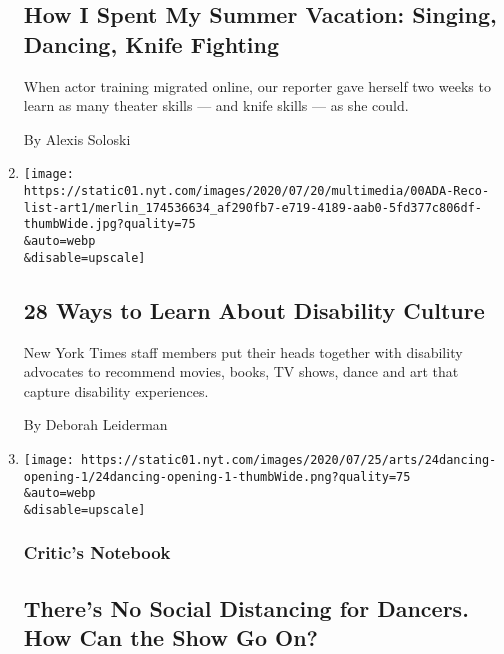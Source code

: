 \begin{enumerate}
{  \subsection{How I Spent My Summer Vacation: Singing, Dancing, Knife
  Fighting}\label{how-i-spent-my-summer-vacation-singing-dancing-knife-fighting}}

  When actor training migrated online, our reporter gave herself two
  weeks to learn as many theater skills --- and knife skills --- as she
  could.

  By Alexis Soloski
\item
  \href{/2020/07/24/arts/disability-movies-books-tv.html}{}

  \texttt{[image: https://static01.nyt.com/images/2020/07/20/multimedia/00ADA-Reco-list-art1/merlin\_174536634\_af290fb7-e719-4189-aab0-5fd377c806df-thumbWide.jpg?quality=75\\\&auto=webp\\\&disable=upscale]}

  \hypertarget{28-ways-to-learn-about-disability-culture}{%
  \subsection{28 Ways to Learn About Disability
  Culture}\label{28-ways-to-learn-about-disability-culture}}

  New York Times staff members put their heads together with disability
  advocates to recommend movies, books, TV shows, dance and art that
  capture disability experiences.

  By Deborah Leiderman
\item
  \href{/2020/07/24/arts/dance/safety-protocols-dance-coronavirus.html}{}

  \texttt{[image: https://static01.nyt.com/images/2020/07/25/arts/24dancing-opening-1/24dancing-opening-1-thumbWide.png?quality=75\\\&auto=webp\\\&disable=upscale]}

  \hypertarget{critics-notebook-1}{%
  \subsubsection{Critic's Notebook}\label{critics-notebook-1}}

  \hypertarget{theres-no-social-distancing-for-dancers-how-can-the-show-go-on}{%
  \subsection{There's No Social Distancing for Dancers. How Can the Show
  Go
  On?}\label{theres-no-social-distancing-for-dancers-how-can-the-show-go-on}}


\end{enumerate}
